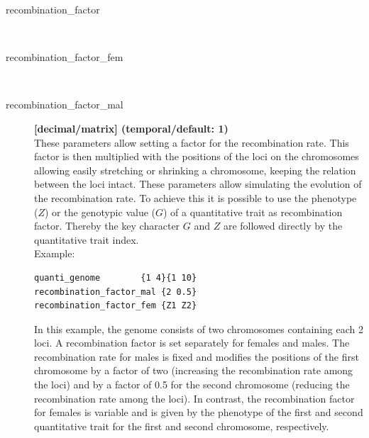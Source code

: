 \documentclass[letterpaper,12pt,oneside]{book}
\begin{document}
\begin{description}
\item[recombination\_factor]\hspace*{\fill}\\
\vspace{-9mm}
\item[recombination\_factor\_fem]\hspace*{\fill}\\
\vspace{-9mm}
\item[recombination\_factor\_mal]\textbf{[decimal/matrix] (temporal/default: 1)}\\
These parameters allow setting a factor for the recombination rate. This factor is then multiplied with the positions of the loci on the chromosomes allowing easily stretching or shrinking a chromosome, keeping the relation between the loci intact. These parameters allow simulating the evolution of the recombination rate. To achieve this it is possible to use the phenotype ($Z$) or the genotypic value ($G$) of a quantitative trait as recombination factor. Thereby the key character $G$ and $Z$ are followed directly by the quantitative trait index. \\

Example:
\begin{lstlisting}[frame=single]
quanti_genome        {1 4}{1 10}
recombination_factor_mal {2 0.5}
recombination_factor_fem {Z1 Z2}
\end{lstlisting}
In this example, the genome consists of two chromosomes containing each 2 loci. A recombination factor is set separately for females and males. The recombination rate for males is fixed and modifies the positions of the first chromosome by a factor of two (increasing the recombination rate among the loci) and by a factor of 0.5 for the second chromosome (reducing the recombination rate among the loci). In contrast, the recombination factor for females is variable and is given by the phenotype of the first and second quantitative trait for the first and second chromosome, respectively.


\end{description}


\newpage


\end{document}
